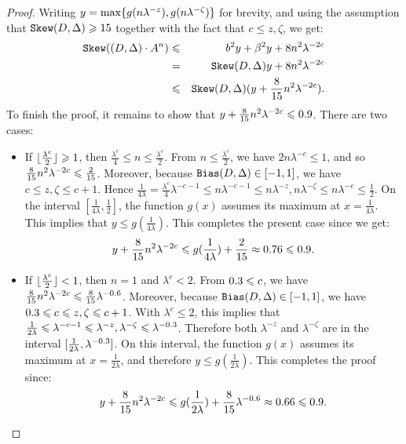 \begin{proof}
\noindent
Writing $y=\max\{g(n{\lambda^{-z}}), g(n{\lambda^{-\zeta}})\}$ for 
brevity, and using the assumption that 
$\sk\state\geq\formula{\P}$ together with 
the fact that $c\leq z,\zeta$, we 
get:
\begin{eqnarray}
  \sk(\state \cdot A^{n}) & \leq & 
  b^2y+\beta^2y+ 8n^2\lambda^{-2c} \nonumber\\
  & = & \sk\state y+ 8n^2\lambda^{-2c} \nonumber\\
  & \leq & \sk\state (y+ 
  \frac{8}{\formula{\P}}n^2\lambda^{-2c}). \nonumber
\end{eqnarray}
To finish the proof, it remains to show that 
$y+ \frac{8}{\formula{\P}}n^2\lambda^{-2c}\leq 
\formula{\Qstep}$.  There are two cases:
\begin{itemize}
  \item If $\lfloor\frac{\lambda^{c}}{2}\rfloor\geqslant 1$, 
  then $\frac{\lambda^{c}}{4}\leq n\leq 
  \frac{\lambda^{c}}{2}$. From $n\leq \frac{\lambda^{c}}{2}$, we have
  $2n\lambda^{-c}\leq 1$, and so  
  $\frac{8}{\formula{\P}}n^2\lambda^{-2c} \leq 
  \frac{2}{\formula{\P}}$. Moreover, because 
  $\mathtt{Bias}(D,\Delta)\in[-1,1]$, we have 
  $c \leq  z,\zeta \leq c+1$. Hence
  $\frac{1}{4\lambda} = \frac{\lambda^{c}}{4} \lambda^{-c-1}
  \leq n\lambda^{-c-1}
  \leq n{\lambda^{-z}}, n{\lambda^{-\zeta}} 
  \leq n\lambda^{-c}
  \leq 
  \frac{1}{2}$. On the interval $[\frac{1}{4\lambda},
  \frac{1}{2}]$, the function $g(x)$ assumes its maximum at
  $x=\frac{1}{4\lambda}$. This implies that $y\leq 
  g(\frac{1}{4\lambda})$. This completes the 
  present case since we get:
  \[
  y+ \frac{8}{\formula{\P}}n^2\lambda^{-2c}\leq 
  g(\frac{1}{4\lambda})
  +\frac{2}{\formula{\P}} 
  \approx\formula{(1/(2*\l)-1)^2+2/\P}
  \leq \formula{\Qstep}.
  \]
  \item If $\lfloor\frac{\lambda^{c}}{2}\rfloor< 1$, 
  then $n=1$ and $\lambda^c< 2$. From 
$\formula{-\a}\leq c$, we have
  $\frac{8}{\formula{\P}}n^2\lambda^{-2c}\leq
  \frac{8}{\formula{\P}}\lambda^{\formula{2*\a}}$.  
  Moreover, because $\mathtt{Bias}(D,\Delta)\in[-1,1]$, we have
  ${\formula{-\a}}\leq c \leq z,\zeta\leq c+1$. With
  $\lambda^c\leq 2$, this implies that $\frac{1}{2\lambda}\leq
  \lambda^{-c-1}\leq \lambda^{-z},\lambda^{-\zeta}
  \leq\lambda^{\formula{\a}}$. Therefore both $\lambda^{-z}$ and
  $\lambda^{-\zeta}$ are in the interval $[\frac{1}{2\lambda},
  \lambda^{\formula{\a}}]$. On this interval, the function $g(x)$
  assumes its maximum at
  $x=\frac{1}{2\lambda}$, and therefore $y\leq 
  g(\frac{1}{2\lambda})$. This completes the 
  proof since:
  \[
  y+\frac{8}{\formula{\P}}n^2\lambda^{-2c}\leq 
  g(\frac{1}{2\lambda})
  + \frac{8}{\formula{\P}}\lambda^{\formula{2*\a}}
  \approx\formula{(max(((2*(pow(\l,\a))-1)^2),
  (((pow(\l,(-1)))-1)^2)) + ((8*(pow (\l, 2*\a))) / \P))}
  \leq \formula{\Qstep}.
  \]
  \end{itemize}
\end{proof}

